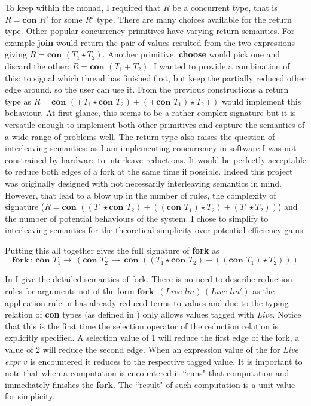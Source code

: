 \documentclass[12pt,twoside,notitlepage]{report}
\begin{document}
To keep within the monad, I required that $ R $ be a concurrent type, that is $ R =  \textbf{con } R' $ for some $ R' $ type. There are many choices available for the return type. Other popular concurrency primitives have varying return semantics. For example \textbf{join} would return the pair of values resulted from the two expressions giving $ R = \textbf{con }(T_1 \star T_2) $. Another primitive, \textbf{choose} would pick one and discard the other: $ R = \textbf{con }(T_1 + T_2) $. I wanted to provide a combination of this: to signal which thread has finished first, but keep the partially reduced other edge around, so the user can use it. From the previous constructions a return type as $ R = \textbf{con }((T_1\star \textbf{con } T_2) + ((\textbf{con } T_1) \star T_2)) $ would implement this behaviour. At first glance, this seems to be a rather complex signature but  it is versatile enough to implement both other primitives and capture the semantics of a wide range of problems well. The return type also raises the question of interleaving semantics: as I am implementing concurrency in software I was not constrained by hardware to interleave reductions. It would be perfectly acceptable to reduce both edges of a fork at the same time if possible. Indeed this project was originally designed with not necessarily interleaving semantics in mind. However, that lead to a blow up in the number of rules, the complexity of signature ($ R = \textbf{con }((T_1\star \textbf{con } T_2) + ((\textbf{con } T_1) \star T_2) + (T_1 \star T_2))   $) and the number of potential behaviours of the system. I chose to simplify to interleaving semantics for the theoretical simplicity over potential efficiency gains.

Putting this all together gives the full signature of \textbf{fork} as 
\[ \textbf{fork} \, : \, \textbf{con } T_1 \rightarrow \, (\textbf{con } T_2\, \rightarrow\, \textbf{con }((T_1\star \textbf{con } T_2) + ((\textbf{con } T_1) \star T_2)) ) \] 



In  I give the detailed semantics of fork. There is no need to describe reduction rules for arguments not of the form $ \textbf{fork }\, (\textit{Live } lm)\,(\textit{Live } lm') $ as the application rule in  has already reduced terms to values and due to the typing relation of \textbf{con } types (as defined in ) only allows values tagged with \textit{Live}. Notice that this is the first time the selection operator of the reduction relation is explicitly specified. A selection value of 1 will reduce the first edge of the fork, a value of 2 will reduce the second edge. When an expression value of the for \textit{Live expr }$ v $ is encountered it reduces to the respective tagged value. It is important to note that when a computation is encountered it ``runs" that computation and immediately finishes the \textbf{fork}. The ``result" of such computation is a unit value for simplicity. 
\end{document}
